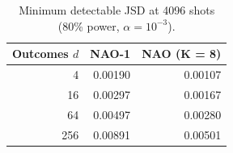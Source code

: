\begin{table}[t]
\centering
\caption{Minimum detectable JSD at 4096 shots (80\% power, $\alpha = 10^{-3}$).}
\label{tab:rq4-mdd}
\small
\begin{tabular}{rrr}
\toprule
Outcomes $d$ & NAO-1 & NAO (K = 8) \\
\midrule
4 & 0.00190 & 0.00107 \\
16 & 0.00297 & 0.00167 \\
64 & 0.00497 & 0.00280 \\
256 & 0.00891 & 0.00501 \\
\bottomrule
\end{tabular}
\end{table}
